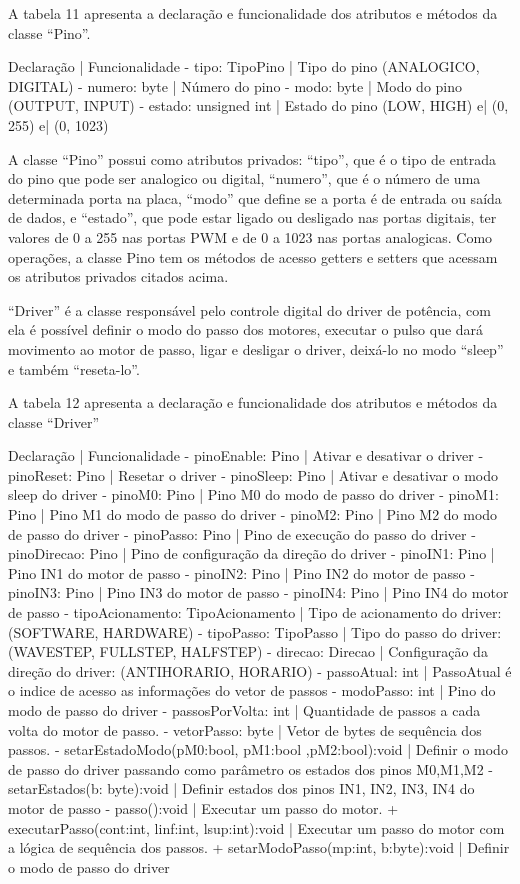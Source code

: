 A tabela 11 apresenta a declaração e funcionalidade dos atributos e métodos da classe “Pino”.


Declaração | Funcionalidade
- tipo: TipoPino | Tipo do pino (ANALOGICO, DIGITAL)
- numero: byte | Número do pino
- modo: byte | Modo do pino (OUTPUT, INPUT)
- estado: unsigned int | Estado do pino (LOW, HIGH) e| (0, 255) e| (0, 1023)

A classe “Pino” possui como atributos privados: “tipo”, que é o tipo de entrada do pino que pode ser 
analogico ou digital, “numero”, que é o número de uma determinada porta na placa, “modo” que define se 
a porta é de entrada ou saída de dados, e “estado”, que pode estar ligado ou desligado nas portas digitais, 
ter valores de 0 a 255 nas portas PWM e de 0 a 1023 nas portas analogicas. Como operações, a classe Pino 
tem os métodos de acesso getters e setters que acessam os atributos privados citados acima.

“Driver” é a classe responsável pelo controle digital do driver de potência, com ela é possível definir 
o modo do passo dos motores, executar o pulso que dará movimento ao motor de passo, ligar e desligar 
o driver, deixá-lo no modo “sleep” e também “reseta-lo”.

A tabela 12 apresenta a declaração e funcionalidade dos atributos e métodos da classe “Driver”



Declaração | Funcionalidade
- pinoEnable: Pino | Ativar e desativar o driver
- pinoReset: Pino | Resetar o driver
- pinoSleep: Pino | Ativar e desativar o modo sleep do driver
- pinoM0: Pino | Pino M0 do modo de passo do driver
- pinoM1: Pino | Pino M1 do modo de passo do driver
- pinoM2: Pino | Pino M2 do modo de passo do driver
- pinoPasso: Pino | Pino de execução do passo do driver
- pinoDirecao: Pino | Pino de configuração da direção do driver
- pinoIN1: Pino | Pino IN1 do motor de passo
- pinoIN2: Pino | Pino IN2 do motor de passo
- pinoIN3: Pino | Pino IN3 do motor de passo
- pinoIN4: Pino | Pino IN4 do motor de passo
- tipoAcionamento: TipoAcionamento | Tipo de acionamento do driver: (SOFTWARE, HARDWARE)
- tipoPasso: TipoPasso | Tipo do passo do driver: (WAVESTEP, FULLSTEP, HALFSTEP)
- direcao: Direcao | Configuração da direção do driver: (ANTIHORARIO, HORARIO)
- passoAtual: int | PassoAtual é o indice de acesso as informações do vetor de passos
- modoPasso: int | Pino do modo de passo do driver
- passosPorVolta: int | Quantidade de passos a cada volta do motor de passo.
- vetorPasso: byte | Vetor de bytes de sequência dos passos.
- setarEstadoModo(pM0:bool, pM1:bool ,pM2:bool):void | Definir o modo de passo do driver passando como parâmetro os estados dos pinos M0,M1,M2
- setarEstados(b: byte):void | Definir estados dos pinos IN1, IN2, IN3, IN4 do motor de passo
- passo():void | Executar um passo do motor.
+ executarPasso(cont:int, linf:int, lsup:int):void | Executar um passo do motor com a lógica de sequência dos passos.
+ setarModoPasso(mp:int, b:byte):void | Definir o modo de passo do driver

